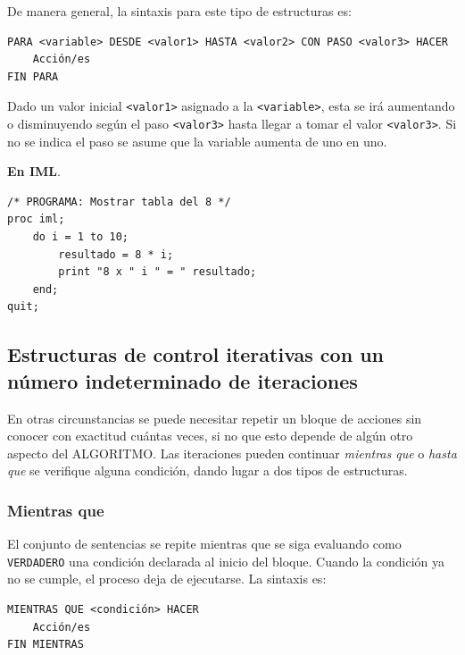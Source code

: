 \documentclass[]{book}
\begin{document}
De manera general, la sintaxis para este tipo de estructuras es:

\begin{verbatim}
PARA <variable> DESDE <valor1> HASTA <valor2> CON PASO <valor3> HACER
    Acción/es
FIN PARA
\end{verbatim}

Dado un valor inicial \texttt{\textless{}valor1\textgreater{}} asignado a la \texttt{\textless{}variable\textgreater{}}, esta se irá aumentando o disminuyendo según el paso \texttt{\textless{}valor3\textgreater{}} hasta llegar a tomar el valor \texttt{\textless{}valor3\textgreater{}}. Si no se indica el paso se asume que la variable aumenta de uno en uno.

\textbf{En IML}.

\begin{verbatim}
/* PROGRAMA: Mostrar tabla del 8 */
proc iml;
    do i = 1 to 10;
        resultado = 8 * i;
        print "8 x " i " = " resultado;
    end;
quit;
\end{verbatim}

\hypertarget{estructuras-de-control-iterativas-con-un-numero-indeterminado-de-iteraciones}{%
\subsection{Estructuras de control iterativas con un número indeterminado de iteraciones}\label{estructuras-de-control-iterativas-con-un-numero-indeterminado-de-iteraciones}}

En otras circunstancias se puede necesitar repetir un bloque de acciones sin conocer con exactitud cuántas veces, si no que esto depende de algún otro aspecto del ALGORITMO. Las iteraciones pueden continuar \emph{mientras que} o \emph{hasta que} se verifique alguna condición, dando lugar a dos tipos de estructuras.

\hypertarget{mientras-que}{%
\subsubsection{Mientras que}\label{mientras-que}}

El conjunto de sentencias se repite mientras que se siga evaluando como \texttt{VERDADERO} una condición declarada al inicio del bloque. Cuando la condición ya no se cumple, el proceso deja de ejecutarse. La sintaxis es:

\begin{verbatim}
MIENTRAS QUE <condición> HACER
    Acción/es
FIN MIENTRAS
\end{verbatim}
\end{document}
